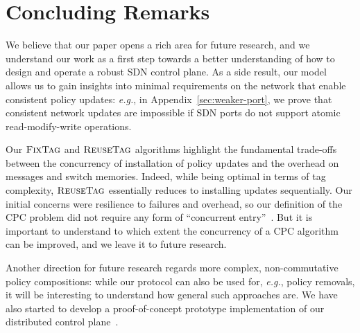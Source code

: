 \documentclass[11pt,pdftex,letter]{article}
\newcommand{\CPO}{\textsc{FixTag}}
\newcommand{\DPO}{\textsc{ReuseTag}}
\newcommand{\eg}{{\it e.g.}}
\begin{document}
\section{Concluding Remarks}\label{sec:conc}

We believe that our paper opens a rich area for future research,
and we understand our work as a first step towards a better understanding of
how to design and operate a robust SDN control plane.
%
As a side result, our model allows us to gain insights into minimal requirements
on the network that enable consistent policy updates: \eg, in Appendix~\ref{sec:weaker-port}, we
prove that consistent network updates are impossible if SDN ports do not support
atomic read-modify-write operations.
%

Our $\CPO$ and $\DPO$ algorithms highlight the fundamental trade-offs
between the concurrency of installation of policy updates and the
overhead on messages and switch memories.
Indeed, while being optimal in terms of tag complexity, $\DPO$
essentially reduces to installing updates sequentially.
Our initial concerns were resilience to failures and overhead, so our
definition of the CPC problem did not require any form of
``concurrent entry''~\cite{GME-00}.
But it is important to understand to which extent the concurrency of a
CPC algorithm can be improved, and we leave it to future research.

Another direction for future research regards more complex, non-commutative policy compositions:
while our protocol can also be used for, \eg, policy removals,
it will be interesting to understand how general such approaches are.
%
We have also started to develop a proof-of-concept prototype implementation of our distributed
control plane~\cite{ons13stn}.

%





\end{document}
